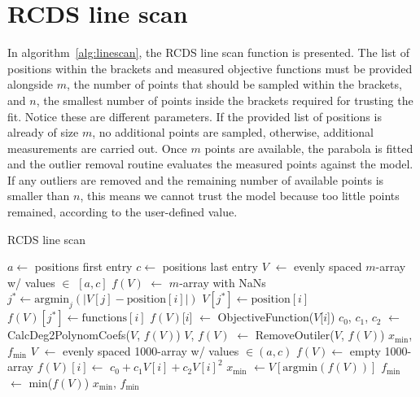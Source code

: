 \section{RCDS line scan}
In algorithm~\ref{alg:linescan}, the RCDS line scan function is presented. The list of positions within the brackets and measured objective functions must be provided alongside $m$, the number of points that should be sampled within the brackets, and $n$, the smallest number of points inside the brackets required for trusting the fit. Notice these are different parameters. If the provided list of positions is already of size $m$, no additional points are sampled, otherwise, additional measurements are carried out. Once $m$ points are available,  the parabola is fitted and the outlier removal routine evaluates the measured points against the model. If any outliers are removed and the remaining number of available points is smaller than $n$, this means we cannot trust the model because too little points remained, according to the user-defined value.

\begin{algorithm}
    \caption{RCDS line scan}\label{alg:linescan}
    \begin{algorithmic}[1]
        \State $a\gets$ positions first entry
        \State $c\gets$ positions last entry
        \State $V$ $\gets$ evenly spaced $m$-array w/ values $\in$ $[a, c]$
        \State $f(V)$ $\gets$ $m$-array with NaNs
            \State $j^*\gets \text{argmin}_{j}(|V[j] - \text{position}[i]|)$
            \State $V[j^*]\gets \text{position}[i]$
            \State $f(V)[j^*]\gets \text{functions}[i]$
        \EndFor
            \State $f(V)$[$i$] $\gets$ ObjectiveFunction($V$[$i$])
        \EndFor
        \State $c_0$, $c_1$, $c_2$ $\gets$ CalcDeg2PolynomCoefs($V$, $f(V)$)
        \State $V$, $f(V)$ $\gets$ RemoveOutiler($V$, $f(V)$)
            \State \Return $x_{\text{min}}$, $f_{\text{min}}$
        \EndIf
        \State $V$ $\gets$ evenly spaced 1000-array w/ values $\in(a,c)$
        \State $f(V)\gets$ empty 1000-array
            \State $f(V)[i] \gets$ $c_0+c_1V[i]+c_2V[i]^2$
        \EndFor
        \State $x_{\text{min}}$ $\gets V[\text{argmin}(f(V))]$
        \State $f_\text{min}$ $\gets$ min($f(V)$)
        \State \Return $x_{\text{min}}$, $f_\text{min}$
    \EndFunction
    \end{algorithmic}
    \end{algorithm}

